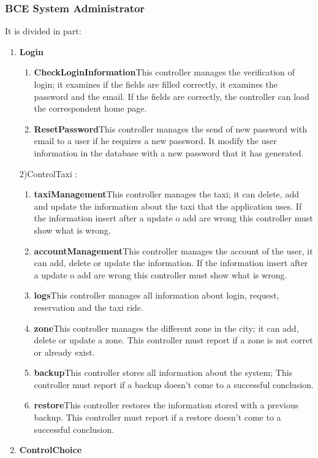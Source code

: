 \documentclass[11pt, a4paper,titlepage]{article}
\begin{document}
\subsubsection{BCE System Administrator}
It is divided in part:
\begin{enumerate}
	\item \textbf{Login}
	\begin{enumerate}
		\item \textbf{CheckLoginInformation}This controller manages the verification of login; it 
		examines if the fields are filled correctly, it examines the password and the email. 
		If the fields are correctly, the controller can load the correspondent home page.
		\item \textbf{ResetPassword}This controller manages the send of new password with email to a 
		user if he requires a new password.
		It modify the user information in the database with a new password that it has 
		generated.
	\end{enumerate}
	2)ControlTaxi :
	\begin{enumerate}
		\item \textbf{taxiManagement}This controller manages the taxi; it can delete, add and update 
		the information about the taxi that the application uses.
		If the information insert after a update o add are wrong this controller must show 
		what is wrong.
		\item \textbf{accountManagement}This controller manages the account of the user, it can add, 
		delete or update the information.
		If the information insert after a update o add are wrong this controller must show 
		what is wrong.
		\item \textbf{logs}This controller manages all information about login, request, reservation  
		and the taxi ride.
		\item \textbf{zone}This controller manages the different zone in the city; it can add, delete 
		or update a zone.
		This controller must report if a zone is not corret or already exist.
		\item \textbf{backup}This controller stores all information about the system;
		This controller must report if a backup doesn’t come to a successful conclusion.
		\item \textbf{restore}This controller restores the information stored with a previous backup.
		This controller must report if a restore doesn’t come to a successful conclusion.
	\end{enumerate}
	\item \textbf{ControlChoice}

\end{enumerate}
\end{document}
